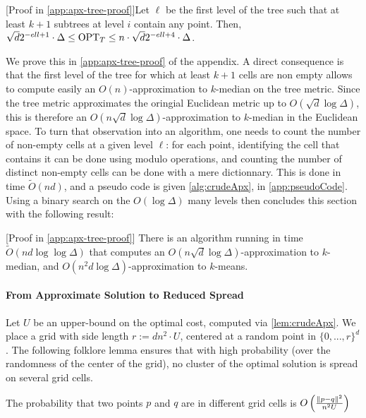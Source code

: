 \begin{lemma}\label{lem:apxTree}
[Proof in \cref{app:apx-tree-proof}]Let $\ell$ be the first level of the tree such that at least $k+1$ subtrees at level $i$ contain any point. Then, $\sqrt{d}2^{-ell+1} \cdot \Delta \leq
\text{OPT}_T \leq n \cdot \sqrt{d}2^{-ell+4} \cdot \Delta$.
\end{lemma}

We prove this in \cref{app:apx-tree-proof} of the appendix. A direct consequence  is that the first level of the tree for which at least $k+1$ cells are non
empty allows to compute easily an $O(n)$-approximation to $k$-median on the tree metric. Since the tree metric approximates the oringial Euclidean metric up to
$O(\sqrt{d} \log \Delta)$, this is therefore an $O(n \sqrt{d} \log \Delta)$-approximation to $k$-median in the Euclidean space.  To turn that observation into
an algorithm, one needs to count the number of non-empty cells at a given level $\ell$: for each point, identifying the cell that contains it can be done using
modulo operations, and counting the number of distinct non-empty cells can be done with a mere dictionnary.  This is done in time $\tilde O(nd)$, and a pseudo
code is given \cref{alg:crudeApx}, in \cref{app:pseudoCode}.  Using a binary search on the $O(\log \Delta)$ many levels then concludes this section with the
following result:

\begin{lemma}\label{lem:crudeApx}[Proof in \cref{app:apx-tree-proof}]
There is an algorithm running in time $\tilde O(nd \log \log \Delta)$ that computes an $O(n \sqrt{d} \log \Delta)$-approximation to $k$-median, and $O(n^2 d \log \Delta)$-approximation to $k$-means.
\end{lemma}




\paragraph*{From Approximate Solution to Reduced Spread}


Let $U$ be an upper-bound on the optimal cost, computed via \cref{lem:crudeApx}. We place a grid with side length $r:= d n^2\cdot U$, centered at a random point in $\{0, ..., r\}^d$.
The following folklore lemma ensures that with high probability (over the randomness of the center of the grid), no cluster of the optimal solution is spread on several grid cells.

\begin{lemma}
The probability that two points $p$ and $q$ are in different grid cells is $O\left( \frac{\|p-q\|^2}{n^2 U}\right)$
\end{lemma}

